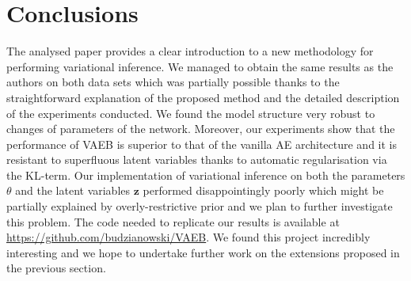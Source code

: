 \chapter*{Conclusions}
The analysed paper provides a clear introduction to a new methodology for performing variational inference. We managed to obtain the same results as the authors on both data sets which was partially possible thanks to the straightforward explanation of the proposed method and the detailed description of the experiments conducted. We found the model structure very robust to changes of parameters of the network. Moreover, our experiments show that the performance of VAEB is superior to that of the vanilla AE architecture and it is resistant to superfluous latent variables thanks to automatic regularisation via the KL-term. Our implementation of variational inference on both the parameters $\theta$ and the latent variables $\mathbf{z}$ performed disappointingly poorly which might be partially explained by overly-restrictive prior and we plan to further investigate this problem. The code needed to replicate our results is available at \url{https://github.com/budzianowski/VAEB}. We found this project incredibly interesting and we hope to undertake further work on the extensions proposed in the previous section.

